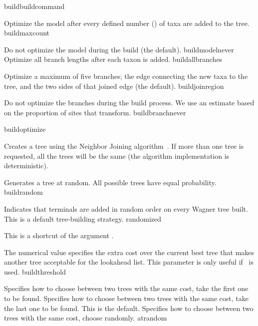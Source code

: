 \begin{command}{build}{buildcommand}
\begin{arguments}
{\begin{description}
{Optimize the model after every defined number (\poyint) of taxa
are added to the tree.} 
{buildmaxcount}

{Do not optimize the model during the build (the default).}
{buildmodelnever}
\\
{Optimize all branch lengths after each taxon is added.}
{buildallbranches}

{Optimize a maximum of five branches; the edge connecting
the new taxa to the tree, and the two sides of that joined
edge (the default).}
{buildjoinregion}

{Do not optimize the branches during the build process. We use
an estimate based on the proportion of sites that transform.}
{buildbranchnever}

\end{description}
}
{buildoptimize}

{Creates a tree using the Neighbor Joining algorithm~\cite{saitou1987}.
If more than one tree is requested, all the trees will be the same
(the algorithm implementation is deterministic).}{}

{Generates a tree at random. All possible trees have equal probability.}
{buildrandom}

{Indicates that terminals are added in random order on every Wagner
tree built. This is a default tree-building strategy.} 
{randomized}

{This is a shortcut of the argument .}
{}

{The numerical value specifies the extra cost over the current best
tree that makes another tree acceptable for the lookahead list. This 
parameter is only useful if~ is used.}
{buildthreshold}

{Specifies how to choose between two trees with the same cost, take the first one to be found.}
{}
{Specifies how to choose between two trees with the same cost, take the last one to be found. This
is the default.}
{}
{Specifies how to choose between two trees with the same cost, choose randomly.}
{atrandom}


\end{arguments}
\end{command}
